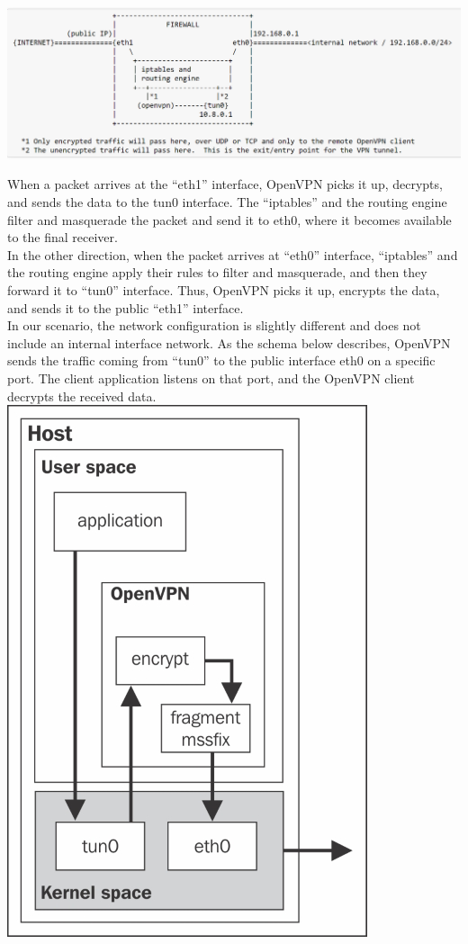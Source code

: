 \documentclass[]{article}
\begin{document}
	\includegraphics[width=1\textwidth]{"images/openvpn_routing_setup.PNG"}

	When a packet arrives at the ``eth1'' interface, OpenVPN picks it up, decrypts, and sends the data to the tun0 interface. The ``iptables'' and the routing engine filter and masquerade the packet and send it to eth0, where it becomes available to the final receiver.\\
	In the other direction, when the packet arrives at ``eth0'' interface, ``iptables'' and the routing engine apply their rules to filter and masquerade, and then they forward it to ``tun0'' interface. Thus, OpenVPN picks it up, encrypts the data, and sends it to the public ``eth1'' interface.\\
	In our scenario, the network configuration is slightly different and does not include an internal interface network. As the schema below describes, OpenVPN sends the traffic coming from ``tun0'' to the public interface eth0 on a specific port. The client application listens on that port, and the OpenVPN client decrypts the received data.\\

	\includegraphics{"images/openvpn_tun_interface.jpg"}
\end{document}
